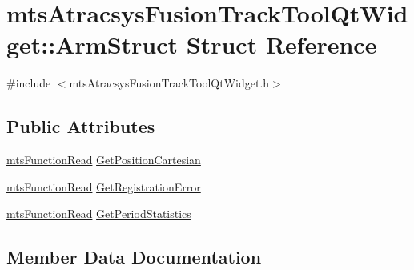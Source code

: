 \hypertarget{structmts_atracsys_fusion_track_tool_qt_widget_1_1_arm_struct}{}\section{mts\+Atracsys\+Fusion\+Track\+Tool\+Qt\+Widget\+:\+:Arm\+Struct Struct Reference}
\label{structmts_atracsys_fusion_track_tool_qt_widget_1_1_arm_struct}


{\ttfamily \#include $<$mts\+Atracsys\+Fusion\+Track\+Tool\+Qt\+Widget.\+h$>$}

\subsection*{Public Attributes}
\begin{DoxyCompactItemize}
\item 
\hyperlink{classmts_function_read}{mts\+Function\+Read} \hyperlink{structmts_atracsys_fusion_track_tool_qt_widget_1_1_arm_struct_ac06e18b6a338d1c54cd11d811bdf87b7}{Get\+Position\+Cartesian}
\item 
\hyperlink{classmts_function_read}{mts\+Function\+Read} \hyperlink{structmts_atracsys_fusion_track_tool_qt_widget_1_1_arm_struct_a81acb90857b57d46a5dd363f92e4316f}{Get\+Registration\+Error}
\item 
\hyperlink{classmts_function_read}{mts\+Function\+Read} \hyperlink{structmts_atracsys_fusion_track_tool_qt_widget_1_1_arm_struct_a750ef720c7009f7277bfb8833249dda6}{Get\+Period\+Statistics}
\end{DoxyCompactItemize}


\subsection{Member Data Documentation}
\hypertarget{structmts_atracsys_fusion_track_tool_qt_widget_1_1_arm_struct_a750ef720c7009f7277bfb8833249dda6}{}
